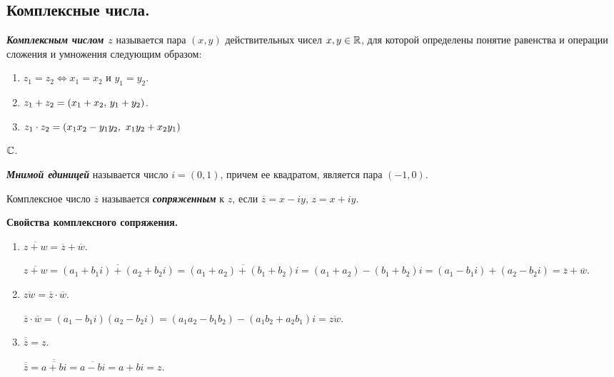 \subsection{
    Комплексные числа.
}

\begin{definition}
    \textbf{\textit{Комплексным числом $z$}} называется пара $(x, y)$ действительных чисел $x, y \in \mathbb{R}$, для которой определены понятие равенства и операции сложения и умножения следующим образом:
    
    \begin{enumerate}[nosep]
        \item $z_1 = z_2 \iff x_1 = x_2$ и $y_1 = y_2$.
        \item $z_1 + z_2 = (x_1 + x_2, \thinspace y_1 + y_2)$.
        \item $z_1 \cdot z_2 = (x_1x_2 - y_1y_2, \thinspace \thinspace x_1y_2 + x_2y_1)$
    \end{enumerate}
\end{definition}

\begin{designation}
    $\mathbb{C}$.
\end{designation}

\begin{definition}
    \textbf{\textit{Мнимой единицей}} называется число $i = (0, 1)$, причем ее квадратом, является пара $(-1, 0)$.
\end{definition}

\begin{definition}
    Комплексное число $\overline{z}$ называется \textbf{\textit{сопряженным}} к $z$, если $\overline{z} = x - iy$, $z = x + iy$.
\end{definition}

\textbf{Свойства комплексного сопряжения.}

\begin{enumerate}[label={\arabic*°.}]
    \item $\overline{z + w} = \overline{z} + \overline{w}.$
    
    $\overline{z + w} = \overline{(a_1 + b_1 i) + (a_2 + b_2 i)} = \overline{(a_1 + a_2) + (b_1 + b_2) i} = (a_1 + a_2) - (b_1 + b_2)i = (a_1 - b_1 i) + (a_2 - b_2 i) = \overline{z} + \overline{w}.$
    
    \item $\overline{zw} = \overline{z} \cdot \overline{w}.$
    
    $\overline{z} \cdot \overline{w} = (a_1 - b_1 i) (a_2 - b_2 i) = (a_1 a_2 - b_1 b_2) - (a_1 b_2 + a_2 b_1) i = \overline{zw}.$

    \item $\overline{\overline{z}} = z.$

    $\overline{\overline{z}} = \overline{\overline{a + bi}} = \overline{a - bi} = a + bi = z.$
\end{enumerate}
